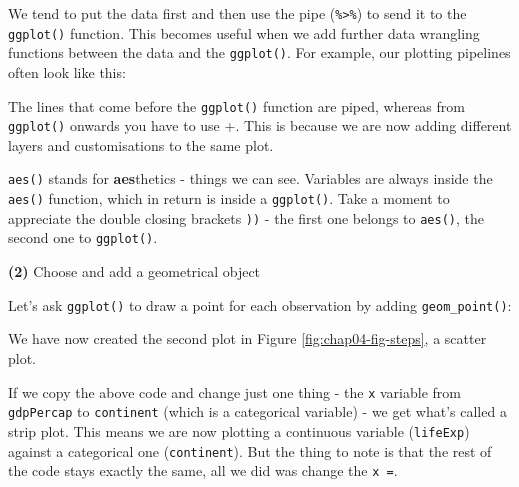 \documentclass[
  12pt,
  krantz2]{krantz}
\makeatletter
\newenvironment{Shaded}{\begin{snugshade}}{\end{snugshade}}
\newcommand{\DataTypeTok}[1]{\textcolor[rgb]{0.13,0.29,0.53}{#1}}
\newcommand{\KeywordTok}[1]{\textcolor[rgb]{0.13,0.29,0.53}{\textbf{#1}}}
\newcommand{\NormalTok}[1]{#1}
\newcommand{\OperatorTok}[1]{\textcolor[rgb]{0.81,0.36,0.00}{\textbf{#1}}}
\newcommand{\StringTok}[1]{\textcolor[rgb]{0.31,0.60,0.02}{#1}}
\newenvironment{kframe}{%
\medskip{}
\setlength{\fboxsep}{.8em}
 \def\at@end@of@kframe{}%
 \ifinner\ifhmode%
  \def\at@end@of@kframe{\end{minipage}}%
  \begin{minipage}{\columnwidth}%
 \fi\fi%
 \def\FrameCommand##1{\hskip\@totalleftmargin \hskip-\fboxsep
 \colorbox{shadecolor}{##1}\hskip-\fboxsep
     \hskip-\linewidth \hskip-\@totalleftmargin \hskip\columnwidth}%
 \MakeFramed {\advance\hsize-\width
   \@totalleftmargin\z@ \linewidth\hsize
   \@setminipage}}%
 {\par\unskip\endMakeFramed%
 \at@end@of@kframe}
\renewenvironment{Shaded}{\begin{kframe}}{\end{kframe}}
\makeatother
\begin{document}
We tend to put the data first and then use the pipe (\texttt{\%\textgreater{}\%}) to send it to the \texttt{ggplot()} function.
This becomes useful when we add further data wrangling functions between the data and the \texttt{ggplot()}.
For example, our plotting pipelines often look like this:

\begin{Shaded}
\end{Shaded}

The lines that come before the \texttt{ggplot()} function are piped, whereas from \texttt{ggplot()} onwards you have to use +.
This is because we are now adding different layers and customisations to the same plot.

\texttt{aes()} stands for \textbf{aes}thetics - things we can see.
Variables are always inside the \texttt{aes()} function, which in return is inside a \texttt{ggplot()}.
Take a moment to appreciate the double closing brackets \texttt{))} - the first one belongs to \texttt{aes()}, the second one to \texttt{ggplot()}.

\textbf{(2)} Choose and add a geometrical object

Let's ask \texttt{ggplot()} to draw a point for each observation by adding \texttt{geom\_point()}:

\begin{Shaded}
\end{Shaded}

We have now created the second plot in Figure \ref{fig:chap04-fig-steps}, a scatter plot.

If we copy the above code and change just one thing - the \texttt{x} variable from \texttt{gdpPercap} to \texttt{continent} (which is a categorical variable) - we get what's called a strip plot.
This means we are now plotting a continuous variable (\texttt{lifeExp}) against a categorical one (\texttt{continent}).
But the thing to note is that the rest of the code stays exactly the same, all we did was change the \texttt{x\ =}.
\end{document}
